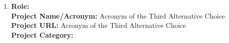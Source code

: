 \documentclass[runningheads]{llncs}
\begin{document}
\begin{description}
\begin{enumerate}
       \item \textbf{Role:}
\\
                \textbf{Project Name/Acronym:} Acronym of the Third Alternative Choice\\
                \textbf{Project URL:} Acronym of the Third Alternative Choice\\
                \textbf{Project Category:} %

\end{enumerate}
\end{description}
\end{document}
